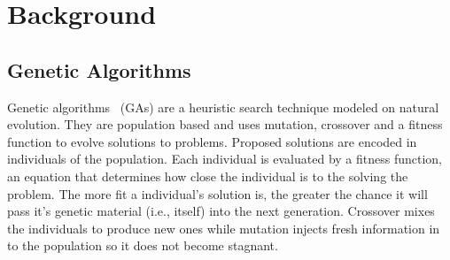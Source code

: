 \documentclass[runningheads,a4paper]{llncs}
\begin{document}
\section{Background}
\label{sec:background}





\subsection{Genetic Algorithms}
\label{sec:genetic_algorithms}

Genetic algorithms~\cite{GA92} (GAs) are a heuristic search technique modeled on natural evolution.  They are population based and uses mutation, crossover and a fitness function to evolve solutions to problems. Proposed solutions are encoded in individuals of the population. Each individual is evaluated by a fitness function, an equation that determines how close the individual is to the solving the problem. The more fit a individual's solution is, the greater the chance it will pass it's genetic material (i.e., itself) into the next generation. Crossover mixes the individuals to produce new ones while mutation injects fresh information in to the population so it does not become stagnant.
\end{document}
